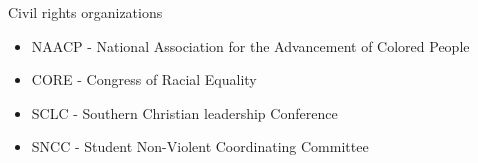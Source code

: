 Civil rights organizations
\begin{itemize}
    \item NAACP - National Association for the Advancement of Colored People
    \item CORE - Congress of Racial Equality
    \item SCLC - Southern Christian leadership Conference
    \item SNCC - Student Non-Violent Coordinating Committee
\end{itemize}
